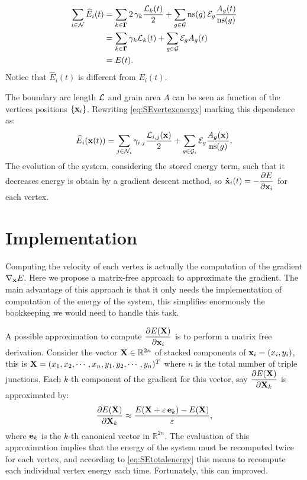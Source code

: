  \begin{align*}
     \sum_{i \in \mathcal{N}}\widehat{E}_i(t) &= \sum_{k \in \bm{\Gamma}}2\,\gamma_{k}\dfrac{\mathcal{L}_{k}(t)}{2} + 
     \sum_{g \in \mathcal{G}} \operatorname{ns}(g)\,\mathcal{E}_{g}\dfrac{A_{g}(t)}{\operatorname{ns}(g)}\\
      &= \sum_{k \in \bm{\Gamma}}\gamma_{k}\mathcal{L}_{k}(t) + 
     \sum_{g \in \mathcal{G}} \mathcal{E}_{g}A_{g}(t) \nonumber\\
     &=E(t).
 \end{align*}
Notice that $\widehat{E}_i(t)$ is different
from $E_i(t)$.

The boundary arc length $\mathcal{L}$ and grain area $A$ can be seen as function of the vertices positions $\{\x_i\}$. Rewriting \eqref{eq:SEvertexenergy} marking this dependence as:
\begin{equation}
    \widehat{E}_i(\x(t)) = \sum_{j \in \mathcal{N}_i}\gamma_{i,j}\dfrac{\AL_{i,j}(\x)}{2} + \sum_{g \in \mathcal{G}_i} \SE_{g}\dfrac{A_{g}(\x)}{\ns(g)},\label{eq:vertexenergy}
\end{equation}
The evolution of the system, considering the stored energy term, such that it decreases energy
is obtain by a gradient descent method, so
$\dotx_i(t) = -\dfrac{\partial E}{\partial \x_i}$ for each vertex.

\section{Implementation}
Computing the velocity of each vertex is actually the computation of the gradient $\nabla_{\x}E$. 
Here we propose a matrix-free approach to approximate the gradient.
The main advantage of this approach is that it only needs the implementation of computation of the energy of the system, this simplifies enormously the bookkeeping we would need to handle this task.

A possible approximation to compute $\dfrac{\partial E(\X)}{\partial \x_i}$ is to perform a matrix free derivation. Consider the vector $\X \in \mathbb{R}^{2n}$ of stacked components of $\x_i =(x_i, y_i)$, this is $\X = (x_1, x_2, \cdots, x_n, y_1, y_2, \cdots, y_n)^T$ where $n$ is the total number of triple junctions. 
Each $k$-th component of the gradient for this vector, say $\dfrac{\partial E(\X)}{\partial \X_k}$ is approximated by:
\begin{equation}
    \frac{\partial E(\X)}{\partial \X_k} \approx 
    \frac{E(\X + \varepsilon\,  \ei{k}) - E(\X)}{\varepsilon},
    \label{eq:partialE}
\end{equation}
where $\mathbf{e}_{k}$ is the $k$-th canonical vector in $\mathbb{R}^{2n}$. 
The evaluation of this approximation implies that the energy of the system must be recomputed twice for each vertex, and according to \eqref{eq:SEtotalenergy} this means to recompute each individual vertex energy each time.
Fortunately, this can improved.


